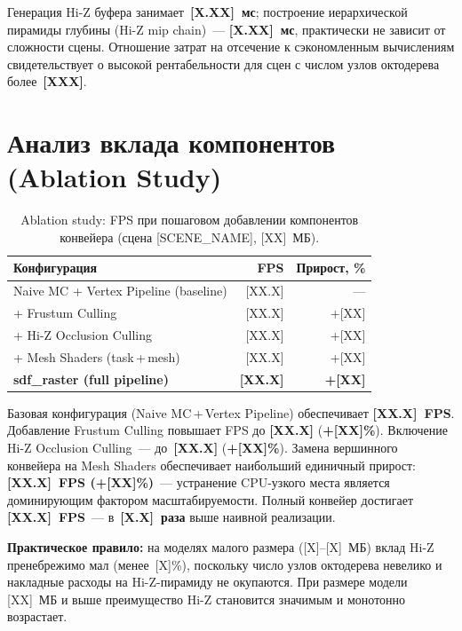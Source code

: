 Генерация Hi-Z буфера занимает~\textbf{[X.XX]~мс}; построение иерархической
пирамиды глубины (Hi-Z mip chain)~--- \textbf{[X.XX]~мс}, практически не
зависит от сложности сцены. Отношение затрат на отсечение к сэкономленным
вычислениям свидетельствует о высокой рентабельности для сцен с числом
узлов октодерева более~\textbf{[XXX]}.

\section{Анализ вклада компонентов (Ablation Study)}
\label{sec:ablation}

\begin{table}[h]
  \centering
  \caption{Ablation study: FPS при пошаговом добавлении компонентов конвейера
    (сцена [SCENE\_NAME], [XX]~МБ).}
  \label{tab:ablation}
  \begin{tabular}{lrr}
    \toprule
    \textbf{Конфигурация} & \textbf{FPS} & \textbf{Прирост, \%} \\
    \midrule
    Naive MC + Vertex Pipeline (baseline) & [XX.X] & ---    \\
    + Frustum Culling                     & [XX.X] & +[XX]  \\
    + Hi-Z Occlusion Culling              & [XX.X] & +[XX]  \\
    + Mesh Shaders (task\,+\,mesh)        & [XX.X] & +[XX]  \\
    \textbf{sdf\_raster (full pipeline)}  & \textbf{[XX.X]} & \textbf{+[XX]} \\
    \bottomrule
  \end{tabular}
\end{table}

Базовая конфигурация (Naive MC\,+\,Vertex Pipeline) обеспечивает
\textbf{[XX.X]~FPS}. Добавление Frustum Culling повышает FPS до
\textbf{[XX.X]} (\textbf{+[XX]\%}). Включение Hi-Z Occlusion Culling~---
до~\textbf{[XX.X]} (\textbf{+[XX]\%}). Замена вершинного конвейера на Mesh
Shaders обеспечивает наибольший единичный прирост:
\textbf{[XX.X]~FPS (+[XX]\%)}~--- устранение CPU-узкого места является
доминирующим фактором масштабируемости. Полный конвейер достигает
\textbf{[XX.X]~FPS}~--- в~\textbf{[X.X]~раза} выше наивной реализации.

\textbf{Практическое правило:} на моделях малого размера ([X]--[X]~МБ)
вклад Hi-Z пренебрежимо мал (менее~[X]\%), поскольку число узлов октодерева
невелико и накладные расходы на Hi-Z-пирамиду не окупаются. При размере
модели [XX]~МБ и выше преимущество Hi-Z становится значимым и монотонно
возрастает.

